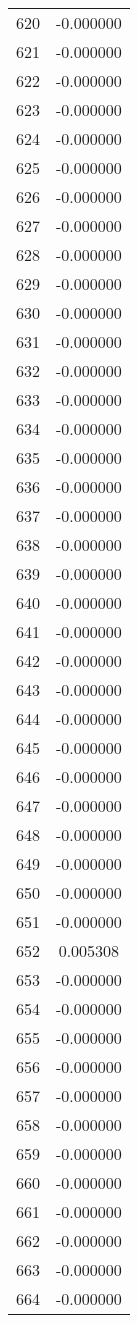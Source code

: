 \documentclass[12pt]{article}
\begin{document}
\begin{longtable}{@{}cc@{}}
620 & -0.000000 \\
621 & -0.000000 \\
622 & -0.000000 \\
623 & -0.000000 \\
624 & -0.000000 \\
625 & -0.000000 \\
626 & -0.000000 \\
627 & -0.000000 \\
628 & -0.000000 \\
629 & -0.000000 \\
630 & -0.000000 \\
631 & -0.000000 \\
632 & -0.000000 \\
633 & -0.000000 \\
634 & -0.000000 \\
635 & -0.000000 \\
636 & -0.000000 \\
637 & -0.000000 \\
638 & -0.000000 \\
639 & -0.000000 \\
640 & -0.000000 \\
641 & -0.000000 \\
642 & -0.000000 \\
643 & -0.000000 \\
644 & -0.000000 \\
645 & -0.000000 \\
646 & -0.000000 \\
647 & -0.000000 \\
648 & -0.000000 \\
649 & -0.000000 \\
650 & -0.000000 \\
651 & -0.000000 \\
652 & 0.005308 \\
653 & -0.000000 \\
654 & -0.000000 \\
655 & -0.000000 \\
656 & -0.000000 \\
657 & -0.000000 \\
658 & -0.000000 \\
659 & -0.000000 \\
660 & -0.000000 \\
661 & -0.000000 \\
662 & -0.000000 \\
663 & -0.000000 \\
664 & -0.000000 \\

\end{longtable}
\end{document}
